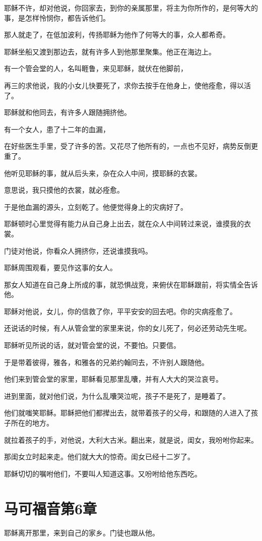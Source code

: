 \documentclass[12pt,oneside]{book}
\begin{document}
耶稣不许，却对他说，你回家去，到你的亲属那里，将主为你所作的，是何等大的事，是怎样怜悯你，都告诉他们。

那人就走了，在低加波利，传扬耶稣为他作了何等大的事，众人都希奇。

耶稣坐船又渡到那边去，就有许多人到他那里聚集。他正在海边上。

有一个管会堂的人，名叫睚鲁，来见耶稣，就伏在他脚前，

再三的求他说，我的小女儿快要死了，求你去按手在他身上，使他痊愈，得以活了。

耶稣就和他同去，有许多人跟随拥挤他。

有一个女人，患了十二年的血漏，

在好些医生手里，受了许多的苦。又花尽了他所有的，一点也不见好，病势反倒更重了。

他听见耶稣的事，就从后头来，杂在众人中间，摸耶稣的衣裳。

意思说，我只摸他的衣裳，就必痊愈。

于是他血漏的源头，立刻乾了。他便觉得身上的灾病好了。

耶稣顿时心里觉得有能力从自己身上出去，就在众人中间转过来说，谁摸我的衣裳。

门徒对他说，你看众人拥挤你，还说谁摸我吗。

耶稣周围观看，要见作这事的女人。

那女人知道在自己身上所成的事，就恐惧战竞，来俯伏在耶稣跟前，将实情全告诉他。

耶稣对他说，女儿，你的信救了你，平平安安的回去吧。你的灾病痊愈了。

还说话的时候，有人从管会堂的家里来说，你的女儿死了，何必还劳动先生呢。

耶稣听见所说的话，就对管会堂的说，不要怕。只要信。

于是带着彼得，雅各，和雅各的兄弟约翰同去，不许别人跟随他。

他们来到管会堂的家里，耶稣看见那里乱囔，并有人大大的哭泣哀号。

进到里面，就对他们说，为什么乱囔哭泣呢，孩子不是死了，是睡着了。

他们就嗤笑耶稣。耶稣把他们都撵出去，就带着孩子的父母，和跟随的人进入了孩子所在的地方。

就拉着孩子的手，对他说，大利大古米。翻出来，就是说，闺女，我吩咐你起来。

那闺女立时起来走。他们就大大的惊奇。闺女已经十二岁了。

耶稣切切的嘱咐他们，不要叫人知道这事。又吩咐给他东西吃。

\chapter{马可福音第6章}
耶稣离开那里，来到自己的家乡。门徒也跟从他。
\end{document}
